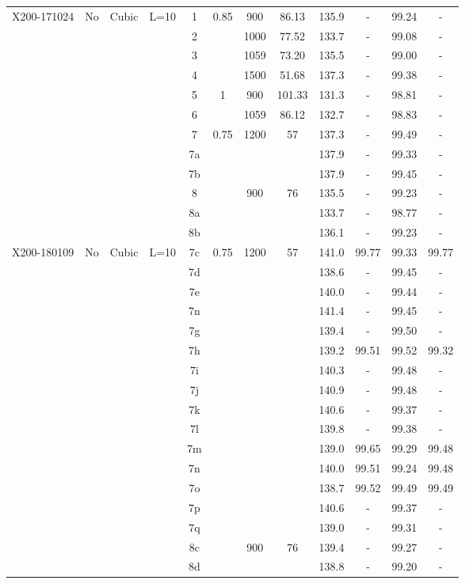 \begin{center}
\begin{landscape}
\begin{savenotes}
\begin{longtable}{@{\extracolsep{\fill}}*{12}{|c}|@{}}
  X200-171024 & No & Cubic & L=10& 1 & 0.85 & 900 & 86.13 &135.9 & - &99.24 &-\\
  & &   & & 2 &  & 1000 & 77.52 &133.7 &- &99.08 &-\\
  & &   & & 3&  & 1059& 73.20 &135.5 & -&99.00 &-\\
  & &  & & 4&  & 1500&51.68 &137.3 & -&99.38 &-\\
  & &  & & 5& 1 & 900&101.33 &131.3 &- &98.81 &-\\
  & &  & & 6&  & 1059&86.12 &132.7 & -&98.83 &-\\
  & & & & 7 & 0.75 & 1200& 57 &137.3 &- &99.49 &-\\
  & & & & 7a & & & &137.9 & -&99.33 &-\\
  & & & & 7b & & & &137.9 &- &99.45 &-\\
  & & & & 8& & 900&76 &135.5 &- &99.23 &-\\
    & & & & 8a & & & & 133.7& -&98.77 &-\\
      & & & & 8b & & & & 136.1& -&99.23 &-\\
\hline  
  X200-180109 & No&Cubic & L=10 & 7c & 0.75 &1200 &57 &141.0 &99.77 &99.33 &99.77\\
  & & & & 7d & && &138.6  &- &99.45 &-\\
  & & & & 7e & & & &140.0 &- &99.44 & -\\
    & & & & 7n & & & &141.4 &- &99.45 &-\\
  & & & & 7g & & & &139.4 & -&99.50 &-\\
  & & & & 7h & & & &139.2 &99.51 &99.52 &99.32\\ 
  & & & & 7i & & & &140.3 &- &99.48 &-\\        
  & & & & 7j & & & &140.9 & -&99.48 &-\\        
  & & & & 7k & & & &140.6 & -&99.37 &-\\        
  & & & & 7l & & & &139.8 & -&99.38 &-\\        
  & & & & 7m & & & &139.0 &99.65 &99.29 &99.48\\      
  & & & & 7n & & & &140.0 &99.51 &99.24 &99.48\\      
  & & & & 7o & & & &138.7 &99.52 &99.49 &99.49\\
  & & & & 7p & & & &140.6 & -&99.37 &-\\
  & & & & 7q & & & &139.0 & -&99.31 &-\\                    
  & & & & 8c& & 900 & 76 &139.4 &- &99.27 &-\\
  & & & & 8d & & & &138.8 & -&99.20 &-\\

\end{longtable}
\end{savenotes}
\end{landscape}
\end{center}
